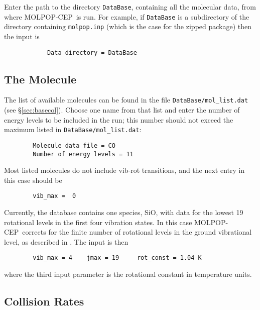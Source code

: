 \documentclass[12pt]{article}
\def\separation {0.5cm}
\def\M{MOLPOP-CEP}
\begin{document}
Enter the path to the directory {\tt DataBase}, containing all the molecular
data, from where \M\ is run. For example, if {\tt DataBase} is a subdirectory
of the directory containing \texttt{molpop.inp} (which is the case for the
zipped package) then the input is

\vspace{\separation}
\begin{verbatim}
            Data directory = DataBase
\end{verbatim}

\subsection{The Molecule}

The list of available molecules can be found in the file
\texttt{DataBase/mol\_list.dat} (see \S\ref{sec:basecol}). Choose one name
from that list and enter the number of energy levels to be included in the run;
this number should not exceed the maximum listed in
\texttt{DataBase/mol\_list.dat}:

\vspace{\separation}
\begin{verbatim}
        Molecule data file = CO     
        Number of energy levels = 11
\end{verbatim}
Most listed molecules do not include vib-rot transitions, and the next entry in
this case should be

\vspace{\separation}
\begin{verbatim}
        vib_max =  0
\end{verbatim}
Currently, the database contains one species, SiO, with data for the lowest 19
rotational levels in the first four vibration states. In this case \M\ corrects
for the finite number of rotational levels in the ground vibrational level, as
described in \cite{lockett_elitzur92}.  The input is then

\vspace{\separation}
\begin{verbatim}
        vib_max = 4    jmax = 19     rot_const = 1.04 K
\end{verbatim}
where the third input parameter is the rotational constant in temperature
units.

\subsection{Collision Rates}
\label{sec:collisions}
\end{document}
